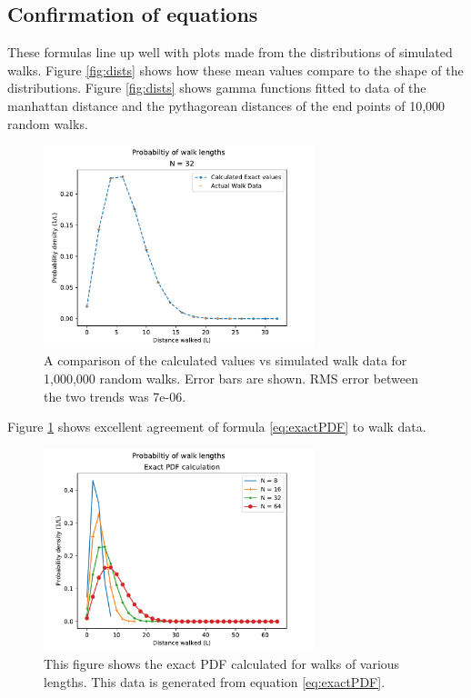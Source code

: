  	\subsection{Confirmation of equations}
	These formulas line up well with plots made from the distributions of simulated walks. 
	Figure \ref{fig:dists} shows how these mean values compare to the shape of the distributions. Figure \ref{fig:dists} shows gamma functions fitted to data of the manhattan distance and the pythagorean distances of the end points of 10,000 random walks. 
	\begin{figure}
	 	\centering
	 	\includegraphics[width = 0.7\textwidth]{figs/calculatedvssimulated.pdf}
	 	\caption{A comparison of the calculated values vs simulated walk data for 1,000,000 random walks. Error bars are shown. RMS error between the two trends was 7e-06. }
	 	\label{fig:exactproof}
	 	\end{figure}
	 	Figure \ref{fig:exactproof} shows excellent agreement of formula \ref{eq:exactPDF} to walk data. 
	 	
	 	
	 	\begin{figure}
	 	\centering
	 	\includegraphics[width = 0.7\textwidth]{figs/exactPDFdemo.pdf}
	 	\caption{This figure shows the exact PDF calculated for walks of various lengths. This data is generated from equation \ref{eq:exactPDF}.}
	 	\label{fig:exactpdfs}
	 	\end{figure}
	 	
